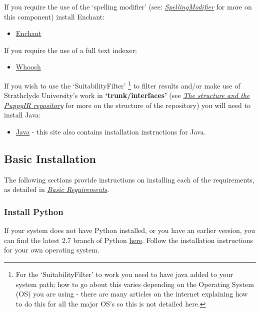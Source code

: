\documentclass[letterpaper,10pt,english]{sphinxmanual}
\begin{document}
If you require the use of the `spelling modifier' (see: {\hyperref[api2.0:puppy-spelling-mod]{\emph{SpellingModifier}}} for more on this component) install Enchant:
\begin{itemize}
\item {} 
\href{http://packages.python.org/pyenchant/}{Enchant}

\end{itemize}

If you require the use of a full text indexer:
\begin{itemize}
\item {} 
\href{http://pypi.python.org/pypi/Whoosh/\#downloads}{Whoosh}

\end{itemize}

If you wish to use the `SuitabilityFilter' \footnote{
For the `SuitabilityFilter' to work you need to have java added to your system path; how to go about this varies depending on the Operating System (OS) you are using - there are many articles on the internet explaining how to do this for all the major OS's so this is not detailed here.
} to filter results and/or make use of Strathclyde University's work in \textbf{`trunk/interfaces'} (see {\hyperref[repo:repo]{\emph{The structure and the PuppyIR repository}}} for more on the structure of the repository) you will need to install Java:
\begin{itemize}
\item {} 
\href{http://www.oracle.com/technetwork/java/javase/downloads/index.html}{Java}  - this site also contains installation instructions for Java.

\end{itemize}


\subsection{Basic Installation}
\label{installation:basic-installation}
The following sections provide instructions on installing each of the requirements, as detailed in {\hyperref[installation:basic-requirements-label]{\emph{Basic Requirements}}}.


\subsubsection{Install Python}
\label{installation:install-python}
If your system does not have Python installed, or you have an earlier version, you can find the latest 2.7 branch of Python \href{http://python.org/download/}{here}. Follow the installation instructions for your own operating system.
\end{document}
